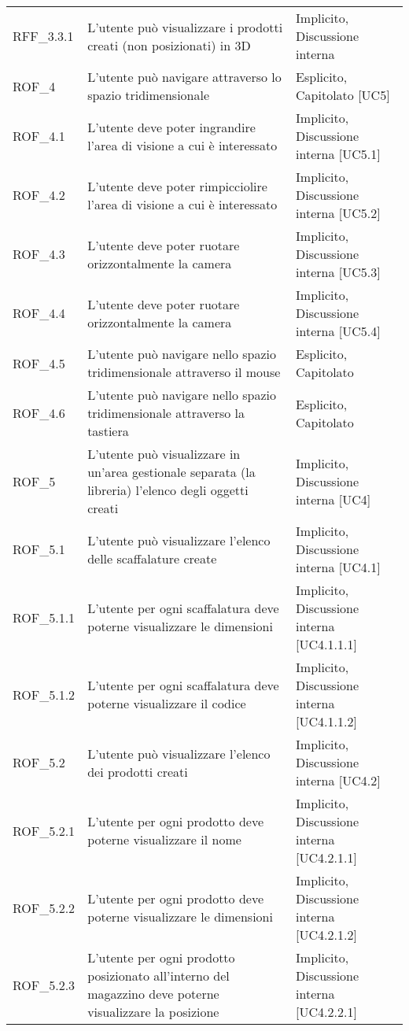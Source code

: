 \begin{xltabular}{\textwidth}{ p{0.1\textwidth} | X | p{0.3\textwidth} }
    RFF\_3.3.1 & L'utente può visualizzare i prodotti creati (non posizionati) in 3D & Implicito, Discussione interna \\      
    ROF\_4 & L'utente può navigare attraverso lo spazio tridimensionale & Esplicito, Capitolato [UC5]\\
    ROF\_4.1 & L'utente deve poter ingrandire l'area di visione a cui è interessato & Implicito, Discussione interna [UC5.1] \\
    ROF\_4.2 & L'utente deve poter rimpicciolire l'area di visione a cui è interessato & Implicito, Discussione interna [UC5.2] \\
    ROF\_4.3 & L'utente deve poter ruotare orizzontalmente la camera & Implicito, Discussione interna [UC5.3] \\
    ROF\_4.4 & L'utente deve poter ruotare orizzontalmente la camera & Implicito, Discussione interna [UC5.4] \\
    ROF\_4.5 & L'utente può navigare nello spazio tridimensionale attraverso il mouse& Esplicito, Capitolato\\
    ROF\_4.6 & L'utente può navigare nello spazio tridimensionale attraverso la tastiera& Esplicito, Capitolato\\
    ROF\_5 & L'utente può visualizzare in un'area gestionale separata (la libreria) l'elenco degli oggetti creati & Implicito, Discussione interna [UC4] \\
    ROF\_5.1 & L'utente può visualizzare l'elenco delle scaffalature create & Implicito, Discussione interna [UC4.1] \\
    ROF\_5.1.1 & L'utente per ogni scaffalatura deve poterne visualizzare le dimensioni & Implicito, Discussione interna [UC4.1.1.1]\\
    ROF\_5.1.2 & L'utente per ogni scaffalatura deve poterne visualizzare il codice & Implicito, Discussione interna [UC4.1.1.2]\\
    ROF\_5.2 & L'utente può visualizzare l'elenco dei prodotti creati & Implicito, Discussione interna [UC4.2] \\
    ROF\_5.2.1 & L'utente per ogni prodotto deve poterne visualizzare il nome & Implicito, Discussione interna [UC4.2.1.1]\\
    ROF\_5.2.2 & L'utente per ogni prodotto deve poterne visualizzare le dimensioni & Implicito, Discussione interna [UC4.2.1.2]\\
    ROF\_5.2.3 & L'utente per ogni prodotto posizionato all'interno del magazzino deve poterne visualizzare la posizione & Implicito, Discussione interna [UC4.2.2.1] \\

\end{xltabular}

